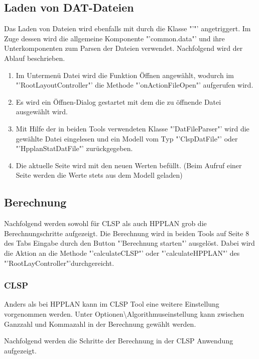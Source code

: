 \documentclass[12pt,a4paper, listof=entryprefix, bibliography=totocnumbered,toc=listofnumbered,lof=listofnumbered]{scrartcl}
\begin{document}
\subsection{Laden von DAT-Dateien}
\label{subsec:ladenDat}

Das Laden von Dateien wird ebenfalls mit durch die Klasse "'"' angetriggert. Im Zuge dessen wird die allgemeine Komponente "'common.data"' und ihre Unterkomponenten zum Parsen der Dateien verwendet. Nachfolgend wird der Ablauf beschrieben.

\begin{enumerate}
	\item Im Untermenü Datei wird die Funktion Öffnen angewählt, wodurch im\\ "'RootLayoutController"' die Methode "'onActionFileOpen"' aufgerufen wird.
	\item Es wird ein Öffnen-Dialog gestartet mit dem die zu öffnende Datei ausgewählt wird.
	\item Mit Hilfe der in beiden Tools verwendeten Klasse "'DatFileParser"' wird die gewählte Datei eingelesen und ein Modell vom Typ "'ClspDatFile"' oder "'HpplanStatDatFile"' zurückgegeben. 
	\item Die aktuelle Seite wird mit den neuen Werten befüllt. (Beim Aufruf einer Seite werden die Werte stets aus dem Modell geladen)
\end{enumerate}


\subsection{Berechnung}
Nachfolgend werden sowohl für CLSP als auch HPPLAN grob die Berechnungschritte aufgezeigt. Die Berechnung wird in beiden Tools auf Seite 8 des Tabs Eingabe durch den Button "'Berechnung starten"' ausgelöst. Dabei wird die Aktion an die Methode "'calculateCLSP"' oder "'calculateHPPLAN"' des "'RootLayController"'durchgereicht.

\subsubsection{CLSP}
Anders als bei HPPLAN kann im CLSP Tool eine weitere Einstellung vorgenommen werden. Unter Optionen\textbackslash Algorithmuseinstellung kann zwischen Ganzzahl und Kommazahl in der Berechnung gewählt werden.

Nachfolgend werden die Schritte der Berechnung in der CLSP Anwendung aufgezeigt.
\end{document}
